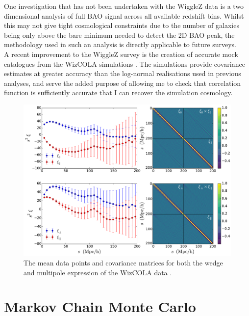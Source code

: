 \documentclass[titlesmallcaps, examinerscopy, copyrightpage]{uqthesis}
\begin{document}
One investigation that has not been undertaken with the WiggleZ data is a two dimensional analysis of full BAO signal across all available redshift bins. Whilst this may not give tight cosmological constraints due to the number of galaxies being only above the bare minimum needed to detect the 2D BAO peak, the methodology used in such an analysis is directly applicable to future surveys.\\

A recent improvement to the WiggleZ survey is the creation of accurate mock catalogues from the WizCOLA simulations \citep{KodaBlake2015}. The simulations provide covariance estimates at greater accuracy than the log-normal realisations used in previous analyses, and serve the added purpose of allowing me to check that correlation function is sufficiently accurate that I can recover the simulation cosmology.\\

\begin{figure}[h!]
  \begin{center}
    \includegraphics[width=\textwidth]{images/wizcola.pdf}
  \end{center}
  \caption{The mean data points and covariance matrices for both the wedge and multipole expression of the WizCOLA data \citep{KazinKoda2014,KodaBlake2015}.}
  \label{fig:wizcola}
\end{figure}


\section{Markov Chain Monte Carlo}
\end{document}
